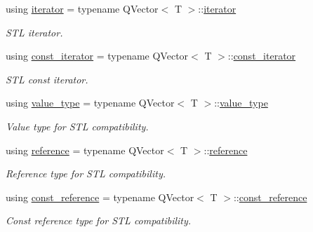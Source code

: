\begin{DoxyCompactItemize}
\item 
using \hyperlink{class_mdt_1_1_plain_text_1_1_record_template_a0785bfc19bfa479d1097dbfcfdd03bef}{iterator} = typename Q\+Vector$<$ T $>$\+::\hyperlink{class_mdt_1_1_plain_text_1_1_record_template_a0785bfc19bfa479d1097dbfcfdd03bef}{iterator}
\begin{DoxyCompactList}\small\item\em S\+TL iterator. \end{DoxyCompactList}\item 
using \hyperlink{class_mdt_1_1_plain_text_1_1_record_template_a3c5cf577c8412857077b2a1f9088c1ae}{const\+\_\+iterator} = typename Q\+Vector$<$ T $>$\+::\hyperlink{class_mdt_1_1_plain_text_1_1_record_template_a3c5cf577c8412857077b2a1f9088c1ae}{const\+\_\+iterator}
\begin{DoxyCompactList}\small\item\em S\+TL const iterator. \end{DoxyCompactList}\item 
using \hyperlink{class_mdt_1_1_plain_text_1_1_record_template_aafbe895c9784b0900130930c5388754a}{value\+\_\+type} = typename Q\+Vector$<$ T $>$\+::\hyperlink{class_mdt_1_1_plain_text_1_1_record_template_aafbe895c9784b0900130930c5388754a}{value\+\_\+type}
\begin{DoxyCompactList}\small\item\em Value type for S\+TL compatibility. \end{DoxyCompactList}\item 
using \hyperlink{class_mdt_1_1_plain_text_1_1_record_template_ab949b8e6a719f3155a6ff2116e3628ce}{reference} = typename Q\+Vector$<$ T $>$\+::\hyperlink{class_mdt_1_1_plain_text_1_1_record_template_ab949b8e6a719f3155a6ff2116e3628ce}{reference}
\begin{DoxyCompactList}\small\item\em Reference type for S\+TL compatibility. \end{DoxyCompactList}\item 
using \hyperlink{class_mdt_1_1_plain_text_1_1_record_template_a0ffd0ced9230d5bf9ee0667187afe4d1}{const\+\_\+reference} = typename Q\+Vector$<$ T $>$\+::\hyperlink{class_mdt_1_1_plain_text_1_1_record_template_a0ffd0ced9230d5bf9ee0667187afe4d1}{const\+\_\+reference}
\begin{DoxyCompactList}\small\item\em Const reference type for S\+TL compatibility. \end{DoxyCompactList}\item 

\end{DoxyCompactItemize}
